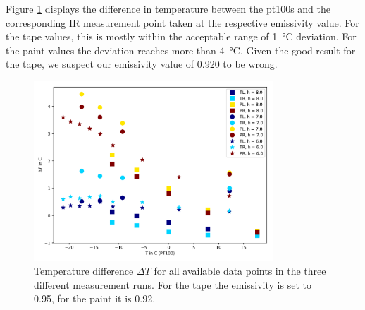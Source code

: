Figure \ref{fig:tempTemp} displays the difference in temperature between the pt100s and the corresponding IR measurement point taken at the respective emissivity value. For the tape values, this is mostly within the acceptable range of \SI{1}{\degreeCelsius} deviation. For the paint values the deviation reaches more than \SI{4}{\degreeCelsius}. Given the good result for the tape, we suspect our emissivity value of 0.920 to be wrong.
\begin{figure}[h!]
	\centering	\includegraphics[width=0.8\textwidth]{img/temp_diff_oneplot.pdf}
	\caption{Temperature difference $\Delta T$ for all available data points in the three different measurement runs. For the tape the emissivity is set to \SI{0.95}{}, for the paint it is  \SI{0.92}{}.}
	\label{fig:tempTemp}
\end{figure}